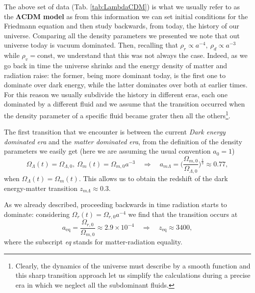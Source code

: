 The above set of data (Tab. \ref{tab:LambdaCDM}) is what we usually refer to as the $\boldsymbol{\Lambda}$\textbf{CDM model} as from this information we can set initial conditions for the Friedmann equation and then study backwards, from today, the history of our universe. Comparing all the density parameters we presented we note that out universe today is vacuum dominated. Then, recalling that $\rho_r\propto a^{-4},\ \rho_d\propto a^{-3}$ while $\rho_v=$const, we understand that this was not always the case. Indeed, as we go back in time the universe shrinks and the energy density of matter and radiation raise: the former, being more dominant today, is the first one to dominate over dark energy, while the latter dominates over both at earlier times.\\
For this reason we usually subdivide the history in different eras, each one dominated by a different fluid and we assume that the transition occurred when the density parameter of a specific fluid became grater then all the others\footnote{Clearly, the dynamics of the universe must describe by a smooth function and this sharp transition approach let us simplify the calculations during a precise era in which we neglect all the subdominant fluids.}.

The first transition that we encounter is between the current \emph{Dark energy dominated era} and the \emph{matter dominated era}, from the definition of the density parameters we easily get (here we are assuming the usual convention $a_0=1$)
$$\Omega_\Lambda(t)=\Omega_{\Lambda,0},\ \Omega_m(t)=\Omega_{m,0}a^{-3}\quad \Rightarrow\quad a_{m\Lambda}=\bigg(\frac{\Omega_{m,0}}{\Omega_{\Lambda,0}}\bigg)^\frac{1}{3}\approx0.77,$$
when $\Omega_\Lambda(t)=\Omega_m(t)$. This allows us to obtain the redshift of the dark energy-matter transition $z_{m\Lambda}\approx0.3$.

As we already described, proceeding backwards in time radiation starts to dominate: considering $\Omega_r(t)=\Omega_{r,0}a^{-4}$ we find that the transition occurs at
$$a_\text{eq}=\frac{\Omega_{r,0}}{\Omega_{m,0}}\approx2.9\times10^{-4}\quad \Rightarrow\quad z_\text{eq}\approx3400,$$ where the subscript \emph{eq} stands for matter-radiation equality. 

